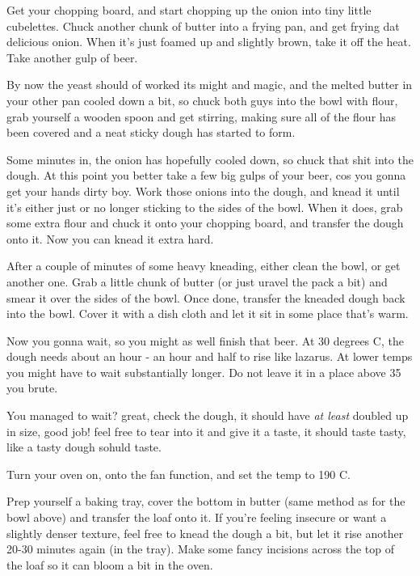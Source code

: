 \documentclass[10pt]{article}
\begin{document}
Get your chopping board, and start chopping up the onion into tiny little cubelettes. Chuck another chunk of butter into a frying pan, and get frying dat delicious onion. When it's just foamed up and slightly brown, take it off the heat. Take another gulp of beer.\par

By now the yeast should of worked its might and magic, and the melted butter in your other pan cooled down a bit, so chuck both guys into the bowl with flour, grab yourself a wooden spoon and get stirring, making sure all of the flour has been covered and a neat sticky dough has started to form.\par

Some minutes in, the onion has hopefully cooled down, so chuck that shit into the dough. At this point you better take a few big gulps of your beer, cos you gonna get your hands dirty boy. Work those onions into the dough, and knead it until it's either just or no longer sticking to the sides of the bowl. When it does, grab some extra flour and chuck it onto your chopping board, and transfer the dough onto it. Now you can knead it extra hard.\par

After a couple of minutes of some heavy kneading, either clean the bowl, or get another one. Grab a little chunk of butter (or just uravel the pack a bit) and smear it over the sides of the bowl. Once done, transfer the kneaded dough back into the bowl. Cover it with a dish cloth and let it sit in some place that's warm.\par

Now you gonna wait, so you might as well finish that beer. At 30 degrees C, the dough needs about an hour - an hour and half to rise like lazarus. At lower temps you might have to wait substantially longer. Do not leave it in a place above 35 you brute.\par

You managed to wait? great, check the dough, it should have \textit{at least} doubled up in size, good job! feel free to tear into it and give it a taste, it should taste tasty, like a tasty dough sohuld taste.\par

Turn your oven on, onto the fan function, and set the temp to 190 C.\par

Prep yourself a baking tray, cover the bottom in butter (same method as for the bowl above) and transfer the loaf onto it. If you're feeling insecure or want a slightly denser texture, feel free to knead the dough a bit, but let it rise another 20-30 minutes again (in the tray). Make some fancy incisions across the top of the loaf so it can bloom a bit in the oven. \par
\end{document}
